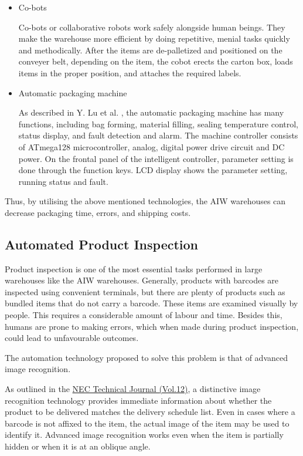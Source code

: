\documentclass{report}
\begin{document}
\begin{itemize}
\begin{figure}[H]
\end{figure}

\item{Co-bots

Co-bots or collaborative robots work safely alongside human beings. They make the warehouse more efficient by doing repetitive, menial tasks quickly and methodically. After the items are de-palletized and positioned on the conveyer belt, depending on the item, the cobot erects the carton box, loads items in the proper position, and attaches the required labels.}


\item{Automatic packaging machine

As described in Y. Lu et al. \cite{5451644}, the automatic packaging machine has many functions, including bag forming, material filling, sealing temperature control, status display, and fault detection and alarm. The machine controller consists of ATmega128 microcontroller, analog, digital power drive circuit and DC power. On the frontal panel of the intelligent controller, parameter setting is done through the function keys. LCD display shows the parameter setting, running status and fault.
}
\end{itemize}

Thus, by utilising the above mentioned technologies, the AIW warehouses can decrease packaging time, errors, and shipping costs.
\subsection{Automated Product Inspection}

Product inspection is one of the most essential tasks performed in large warehouses like the AIW warehouses. Generally, products with barcodes are inspected using convenient terminals, but there are plenty of products such as bundled items that do not carry a barcode. These items are examined visually by people. This requires a considerable amount of labour and time. Besides this, humans are prone to making errors, which when made during product inspection, could lead to unfavourable outcomes.

The automation technology proposed to solve this problem is that of advanced image recognition.

As outlined in the \href{https://www.nec.com/en/global/techrep/journal/g17/n01/170108.html#:~:text=The%20greatest%20advantage%20of%20the,3}{NEC Technical Journal (Vol.12)}, a distinctive image recognition technology provides immediate information about whether the product to be delivered matches the delivery schedule list. Even in cases where a barcode is not affixed to the item, the actual image of the item may be used to identify it. Advanced image recognition works even when the item is partially hidden or when it is at an oblique angle.
\end{document}
